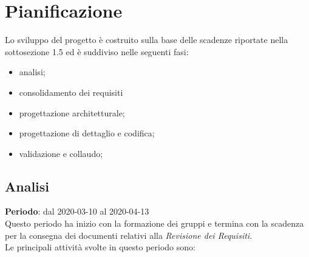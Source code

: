 \section{Pianificazione}
Lo sviluppo del progetto è costruito sulla base delle scadenze riportate nella sottosezione 1.5 ed è suddiviso nelle seguenti fasi:
\begin{itemize}
	\item analisi;
	\item consolidamento dei requisiti
	\item progettazione architetturale;
	\item progettazione di dettaglio e codifica;
	\item validazione e collaudo;
\end{itemize}

\subsection{Analisi}
\textbf{Periodo}: dal 2020-03-10 al 2020-04-13 \\
Questo periodo ha inizio con la formazione dei gruppi e termina con la scadenza per la consegna dei documenti relativi alla \textit{Revisione dei Requisiti}. \\
Le principali attività svolte in questo periodo sono:
